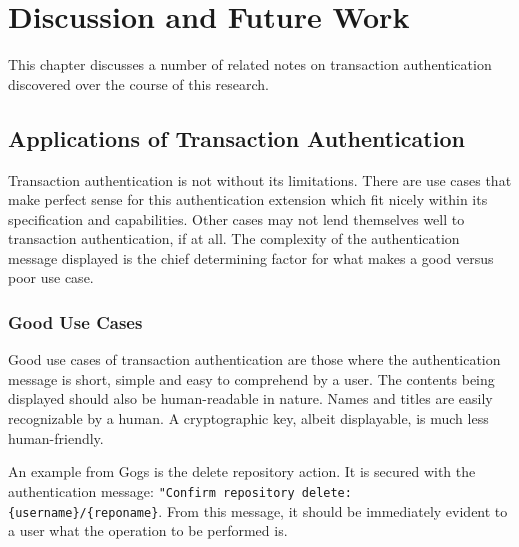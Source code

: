 
\chapter{Discussion and Future Work}

This chapter discusses a number of related notes on transaction authentication discovered over the course of this research. 

\section{Applications of Transaction Authentication}

Transaction authentication is not without its limitations. There are use cases that make perfect sense for this authentication extension which fit nicely within its specification and capabilities. Other cases may not lend themselves well to transaction authentication, if at all. The complexity of the authentication message displayed is the chief determining factor for what makes a good versus poor use case.



\subsection{Good Use Cases}

Good use cases of transaction authentication are those where the authentication message is short, simple and easy to comprehend by a user. The contents being displayed should also be human-readable in nature. Names and titles are easily recognizable by a human. A cryptographic key, albeit displayable, is much less human-friendly. 

An example from Gogs is the delete repository action. It is secured with the authentication message: \lstinline|"Confirm repository delete: {username}/{reponame}|. From this message, it should be immediately evident to a user what the operation to be performed is. 

